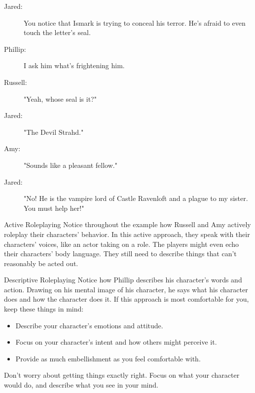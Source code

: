 \documentclass[10pt,a4paper,twoside,bg=print,twocolumn,openany,nodeprecatedcode]{dndbook}
\begin{document}
\begin{description}
\item[Jared:]
You notice that Ismark is trying to conceal his terror. He's afraid to even touch the letter's seal.
\item[Phillip:]
I ask him what's frightening him.
\item[Russell:]
"Yeah, whose seal is it?"
\item[Jared:]
"The Devil Strahd."
\item[Amy:]
"Sounds like a pleasant fellow."
\item[Jared:]
"No! He is the vampire lord of Castle Ravenloft and a plague to my sister. You must help her!"
\end{description}

\begin{DndSidebar}[float=!b]{Active Roleplaying}
Notice throughout the example how Russell and Amy actively roleplay their characters' behavior. In this active approach, they speak with their characters' voices, like an actor taking on a role. The players might even echo their characters' body language. They still need to describe things that can't reasonably be acted out.



\end{DndSidebar}

\begin{DndSidebar}[float=!b]{Descriptive Roleplaying}
Notice how Phillip describes his character's words and action. Drawing on his mental image of his character, he says what his character does and how the character does it. If this approach is most comfortable for you, keep these things in mind:




\begin{itemize}
\item Describe your character's emotions and attitude.
\item Focus on your character's intent and how others might perceive it.
\item Provide as much embellishment as you feel comfortable with.
\end{itemize}



Don't worry about getting things exactly right. Focus on what your character would do, and describe what you see in your mind.



\end{DndSidebar}
\end{document}
